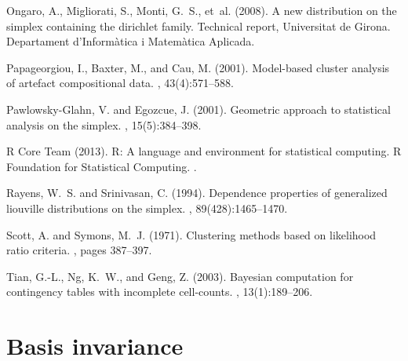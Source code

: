 \documentclass[10pt, a4paper]{article}
\begin{document}
\begin{thebibliography}{00}
Ongaro, A., Migliorati, S., Monti, G.~S., et~al. (2008).
\newblock A new distribution on the simplex containing the dirichlet family.
\newblock Technical report, Universitat de Girona. Departament
  d'Inform{\`a}tica i Matem{\`a}tica Aplicada.

Papageorgiou, I., Baxter, M., and Cau, M. (2001).
\newblock Model-based cluster analysis of artefact compositional data.
, 43(4):571--588.


Pawlowsky-Glahn, V. and Egozcue, J. (2001).
\newblock Geometric approach to statistical analysis on the simplex.
,
  15(5):384--398.

R Core Team (2013).
\newblock R: A language and environment for statistical computing. R Foundation for Statistical Computing.
.

Rayens, W.~S. and Srinivasan, C. (1994).
\newblock Dependence properties of generalized liouville distributions on the
  simplex.
,
  89(428):1465--1470.

Scott, A. and Symons, M.~J. (1971).
\newblock Clustering methods based on likelihood ratio criteria.
, pages 387--397.

Tian, G.-L., Ng, K.~W., and Geng, Z. (2003).
\newblock Bayesian computation for contingency tables with incomplete
  cell-counts.
, 13(1):189--206.

\end{thebibliography}

\newpage
\appendix
\section{Basis invariance}
\end{document}
